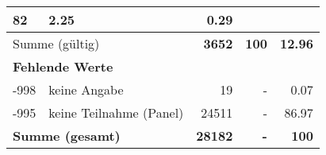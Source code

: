 \begin{longtable}{lXrrr}
       \num{82} &
       \num[round-mode=places,round-precision=2]{2,25} &
         \num[round-mode=places,round-precision=2]{0,29} \\
     \midrule
     \multicolumn{2}{l}{Summe (gültig)} &
       \textbf{\num{3652}} &
     \textbf{100} &
       \textbf{\num[round-mode=places,round-precision=2]{12,96}} \\
     \multicolumn{5}{l}{\textbf{Fehlende Werte}}\\
       -998 &
       keine Angabe &
         \num{19} &
        - &
         \num[round-mode=places,round-precision=2]{0,07} \\
       -995 &
       keine Teilnahme (Panel) &
         \num{24511} &
        - &
         \num[round-mode=places,round-precision=2]{86,97} \\
     \midrule
     \multicolumn{2}{l}{\textbf{Summe (gesamt)}} &
          \textbf{\num{28182}} &
        \textbf{-} &
        \textbf{100} \\
     \bottomrule
     \end{longtable}
     
